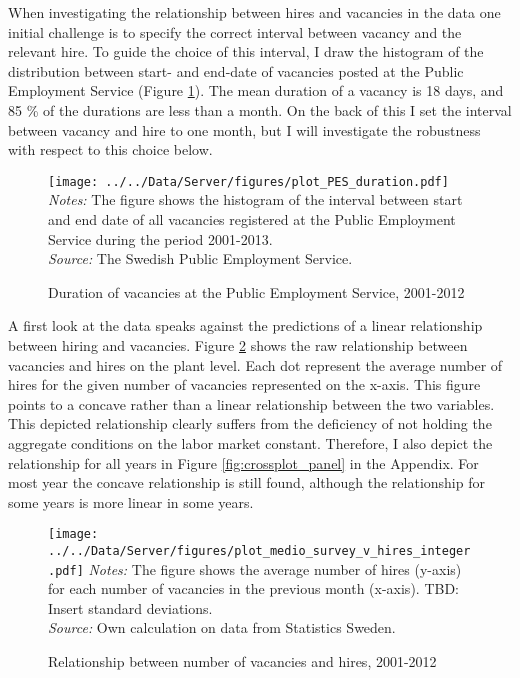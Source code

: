 When investigating the relationship between hires and vacancies in the data one initial challenge is to specify the correct interval between vacancy and the relevant hire. To guide the choice of this interval, I draw the histogram of the distribution between start- and end-date of vacancies posted at the Public Employment Service (Figure \ref{fig:PES_duration}). The mean duration of a vacancy is 18 days, and 85 \% of the durations are less than a month. On the back of this I set the interval between vacancy and hire to one month, but I will investigate the robustness with respect to this choice below. 

\begin{figure}[t]
\centering
\caption{Duration of vacancies at the Public Employment Service, 2001-2012}
\texttt{[image: ../../Data/Server/figures/plot\_PES\_duration.pdf]}
\flushleft
\footnotesize{\emph{Notes:} The figure shows the histogram of the interval between start and end date of all vacancies registered at the Public Employment Service during the period 2001-2013.} \\
\footnotesize{\emph{Source:} The Swedish Public Employment Service.}
\label{fig:PES_duration}
\end{figure}

A first look at the data speaks against the predictions of a linear relationship between hiring and vacancies. Figure \ref{fig:crossplot} shows the raw relationship between vacancies and hires on the plant level. Each dot represent the average number of hires for the given number of vacancies represented on the x-axis. This figure points to a concave rather than a linear relationship between the two variables. This depicted relationship clearly suffers from the deficiency of not holding the aggregate conditions on the labor market constant. Therefore, I also depict the relationship for all years in Figure \ref{fig:crossplot_panel} in the Appendix. For most year the concave relationship is still found, although the relationship for some years is more linear in some years. 

\begin{figure}[h]
\centering
\caption{Relationship between number of vacancies and hires, 2001-2012}
\texttt{[image: ../../Data/Server/figures/plot\_medio\_survey\_v\_hires\_integer.pdf]}
\flushleft
\footnotesize{\emph{Notes:} The figure shows the average number of hires (y-axis) for each number of vacancies in the previous month (x-axis). TBD: Insert standard deviations.} \\
\footnotesize{\emph{Source:} Own calculation on data from Statistics Sweden.}
\label{fig:crossplot}
\end{figure}

